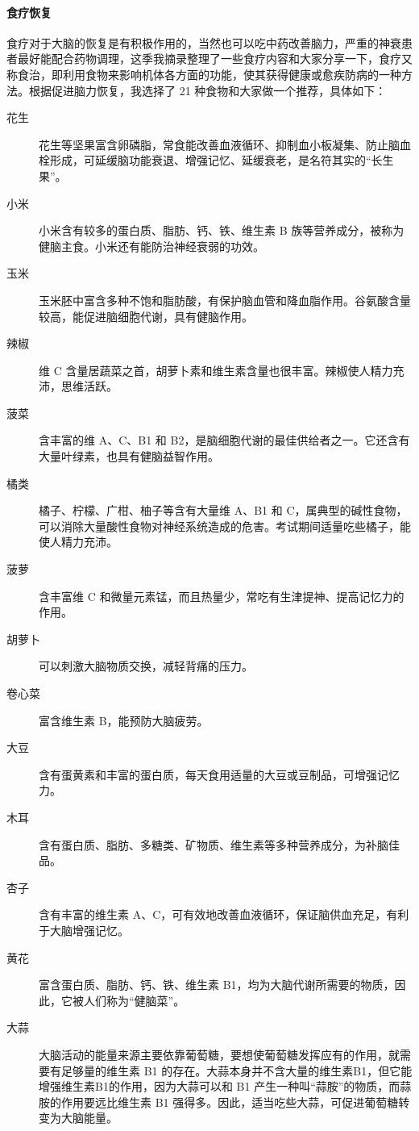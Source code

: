 \documentclass{ctexart}
\begin{document}
\paragraph{食疗恢复} 食疗对于大脑的恢复是有积极作用的，当然也可以吃中药改善脑力，严重的神衰患者最好能配合药物调理，这季我摘录整理了一些食疗内容和大家分享一下，食疗又称食治，即利用食物来影响机体各方面的功能，使其获得健康或愈疾防病的一种方法。根据促进脑力恢复，我选择了 21 种食物和大家做一个推荐，具体如下：

\begin{description}
    \item[花生] 花生等坚果富含卵磷脂，常食能改善血液循环、抑制血小板凝集、防止脑血栓形成，可延缓脑功能衰退、增强记忆、延缓衰老，是名符其实的“长生果”。
    \item[小米] 小米含有较多的蛋白质、脂肪、钙、铁、维生素 B 族等营养成分，被称为健脑主食。小米还有能防治神经衰弱的功效。
    \item[玉米] 玉米胚中富含多种不饱和脂肪酸，有保护脑血管和降血脂作用。谷氨酸含量较高，能促进脑细胞代谢，具有健脑作用。
    \item[辣椒] 维 C 含量居蔬菜之首，胡萝卜素和维生素含量也很丰富。辣椒使人精力充沛，思维活跃。
    \item[菠菜] 含丰富的维 A、C、B1 和 B2，是脑细胞代谢的最佳供给者之一。它还含有大量叶绿素，也具有健脑益智作用。
    \item[橘类] 橘子、柠檬、广柑、柚子等含有大量维 A、B1 和 C，属典型的碱性食物，可以消除大量酸性食物对神经系统造成的危害。考试期间适量吃些橘子，能使人精力充沛。
    \item[菠萝] 含丰富维 C 和微量元素锰，而且热量少，常吃有生津提神、提高记忆力的作用。
    \item[胡萝卜] 可以刺激大脑物质交换，减轻背痛的压力。
    \item[卷心菜] 富含维生素 B，能预防大脑疲劳。
    \item[大豆] 含有蛋黄素和丰富的蛋白质，每天食用适量的大豆或豆制品，可增强记忆力。
    \item[木耳] 含有蛋白质、脂肪、多糖类、矿物质、维生素等多种营养成分，为补脑佳品。
    \item[杏子] 含有丰富的维生素 A、C，可有效地改善血液循环，保证脑供血充足，有利于大脑增强记忆。
    \item[黄花] 富含蛋白质、脂肪、钙、铁、维生素 B1，均为大脑代谢所需要的物质，因此，它被人们称为“健脑菜”。
    \item[大蒜] 大脑活动的能量来源主要依靠葡萄糖，要想使葡萄糖发挥应有的作用，就需要有足够量的维生素 B1 的存在。大蒜本身并不含大量的维生素B1，但它能增强维生素B1的作用，因为大蒜可以和 B1 产生一种叫“蒜胺”的物质，而蒜胺的作用要远比维生素 B1 强得多。因此，适当吃些大蒜，可促进葡萄糖转变为大脑能量。

\end{description}
\end{document}
